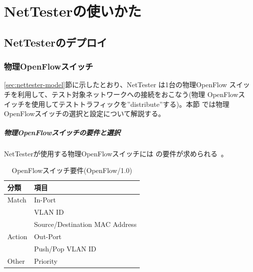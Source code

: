 
\chapter{NetTesterの使いかた}
\label{chap:nettester-usage}

 \section{NetTesterのデプロイ}
 \label{sec:nettester-deployment}

  \subsection{物理OpenFlowスイッチ}
  \label{sec:nettester-deploy-psw}


\ref{sec:nettester-model}節に示したとおり、NetTester は1台の物理OpenFlow
スイッチを利用して、テスト対象ネットワークへの接続をおこなう(物理
OpenFlowスイッチを使用してテストトラフィックを''distribute''する)。本節
では物理OpenFlowスイッチの選択と設定について解説する。

    \paragraph{物理OpenFlowスイッチの要件と選択}
NetTesterが使用する物理OpenFlowスイッチには
の要件が求められる~\cite{l1pjpoc}。

\begin{table}[h]
 \centering
 \caption{OpenFlowスイッチ要件(OpenFlow/1.0)}
 \label{tab:ofs-requirement}
 \begin{tabular}{l|l}
  \hline
  分類 & 項目 \\
  \hline
  \hline
  Match  & In-Port \\ \cline{2-2}
         & VLAN ID \\ \cline{2-2}
         & Source/Destination MAC Address \\ \hline
  Action & Out-Port \\ \cline{2-2}
         & Push/Pop VLAN ID \\ \hline
  Other & Priority \\
  \hline
 \end{tabular}
\end{table}

